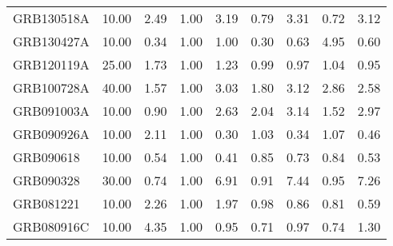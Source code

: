 \begin{tabular}{lrrrrrrrr}
GRB130518A & 10.00 & 2.49 & 1.00 & 3.19 & 0.79 & 3.31 & 0.72 & 3.12 \\
GRB130427A & 10.00 & 0.34 & 1.00 & 1.00 & 0.30 & 0.63 & 4.95 & 0.60 \\
GRB120119A & 25.00 & 1.73 & 1.00 & 1.23 & 0.99 & 0.97 & 1.04 & 0.95 \\
GRB100728A & 40.00 & 1.57 & 1.00 & 3.03 & 1.80 & 3.12 & 2.86 & 2.58 \\
GRB091003A & 10.00 & 0.90 & 1.00 & 2.63 & 2.04 & 3.14 & 1.52 & 2.97 \\
GRB090926A & 10.00 & 2.11 & 1.00 & 0.30 & 1.03 & 0.34 & 1.07 & 0.46 \\
GRB090618 & 10.00 & 0.54 & 1.00 & 0.41 & 0.85 & 0.73 & 0.84 & 0.53 \\
GRB090328 & 30.00 & 0.74 & 1.00 & 6.91 & 0.91 & 7.44 & 0.95 & 7.26 \\
GRB081221 & 10.00 & 2.26 & 1.00 & 1.97 & 0.98 & 0.86 & 0.81 & 0.59 \\
GRB080916C & 10.00 & 4.35 & 1.00 & 0.95 & 0.71 & 0.97 & 0.74 & 1.30 \\
\bottomrule
\end{tabular}
